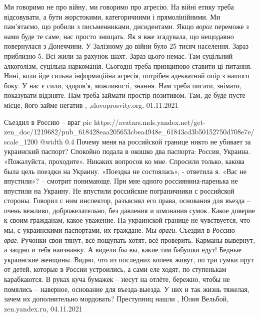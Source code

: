 Ми говоримо не про війну, ми говоримо про агресію. На війні етику треба
відсовувати, а бути жорстокими, категоричними і прямолінійними. Ми пам’ятаємо,
що робили з письменниками, дисидентами. Якщо \emph{ворог} переможе з нами буде те
саме, нас просто знищать.  Як я вже згадувала, що нещодавно повернулася з
Донеччини. У Залізному до війни було 25 тисяч населення. Зараз – приблизно 5.
Всі жили за рахунок шахт. Зараз цього немає. Там суцільний алкоголізм, суцільна
наркоманія. Сьогодні треба принципово ставити ці питання. Нині, коли йде сильна
інформаційна агресія, потрібен адекватний опір з нашого боку.  У нас є сили,
здоров’я, можливості, знання. Нам треба писати, знімати, показувати відзняте.
Нам треба займати простір позитивом. Там, де буде пусте місце, його займе
негатив
, ,slovoprosvity.org, 01.11.2021

Съездил в Россию – враг
\ifcmt
  pic https://avatars.mds.yandex.net/get-zen_doc/1219682/pub_618428eaa205653cbea4948e_61843cd3b50152750d708e7e/scale_1200
  @width 0.4
\fi
Почему меня на российской границе никто не убивает за украинский паспорт?
Спокойно подала в окошко два паспорта: Россия, Украина. «Пожалуйста,
проходите». Никаких вопросов ко мне. Спросили только, какова была цель поездки
на Украину. «Поездка не состоялась», - ответила я. «Вас не впустили»? – смотрит
понимающе.  При мне одного россиянина-паренька не впустили на Украину. Не
впустили российские пограничники с российской стороны. Говорил с ним инспектор,
разъяснял его права, основания для въезда – очень вежливо, доброжелательно, без
давления и шмонания сумок. Какое доверие к своим гражданам, какое уважение.  На
украинской границе не чувствуется, что мы, с украинскими паспортами, их
граждане. Мы \emph{враги}. Съездил в Россию – \emph{враг}. Ручонки свои тянут, всё пощупать
хотят, всё проверить. Карманы вывернут, а заодно и тебя наизнанку.  А видели бы
вы, какие там бабушки едут! Бедные украинские женщины. Видно, что из последних
копеек живут, по три сумки прут от детей, которые в России устроились, а сами
еле ходят, по ступенькам карабкаются. В руках куча бумажек – несут на отлёте,
бережно, чтобы не помялись – наверное, основание для въезда-выезда. У них и так
жизнь тяжелая, зачем их дополнительно мордовать? Преступниц нашли
, Юлия Вельбой, zen.yandex.ru, 04.11.2021

